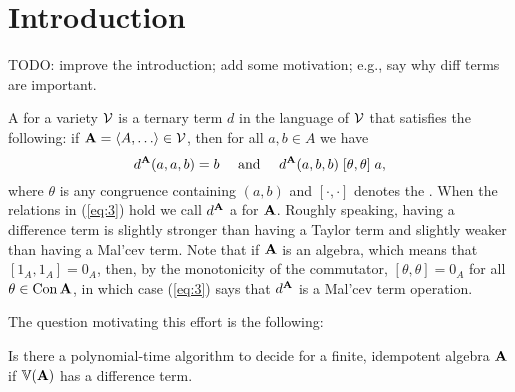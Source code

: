 %
\IEEEpeerreviewmaketitle



\section{Introduction}
\label{sec:introduction}


TODO: improve the introduction; add some motivation; e.g., say why diff terms
are important.

A  for a variety $\mathcal{V}$ is a ternary term $d$ in the
language of $\mathcal{V}$ that satisfies the following:
if $\bA = \<A, \dots \> \in \sV$, then for all $a, b \in A$ we have
\begin{equation}
\label{eq:3}  
d^{\bA}(a,a,b) = b \quad \text{ and } \quad
d^{\bA}(a,b,b) \comm \theta \theta a,
\end{equation}
where $\theta$ is any congruence %
containing $(a,b)$
and $[\cdot, \cdot]$ denotes the .
When the relations in (\ref{eq:3}) hold we call $d^{\mathbf{A}}$
a  for $\mathbf{A}$.
Roughly speaking, having a difference term is slightly stronger than having
a Taylor term and slightly weaker than having a Mal'cev term.  Note that if
$\mathbf{A}$ is an  algebra, which means that $[1_A, 1_A] = 0_A$, then, by
the monotonicity of the commutator,
$[\theta, \theta] = 0_A$ for all $\theta \in \operatorname{Con} \mathbf{A}$, in which case
(\ref{eq:3}) says that $d^{\mathbf{A}}$ is a Mal'cev term operation.


The question motivating this effort is the following:
\begin{prob}
  \label{prob:1}
  Is there a polynomial-time algorithm to decide for a finite,
  idempotent algebra $\mathbf{A}$ if $\operatorname{\mathbb{V}}(\mathbf{A})$ has a difference term.
\end{prob}



